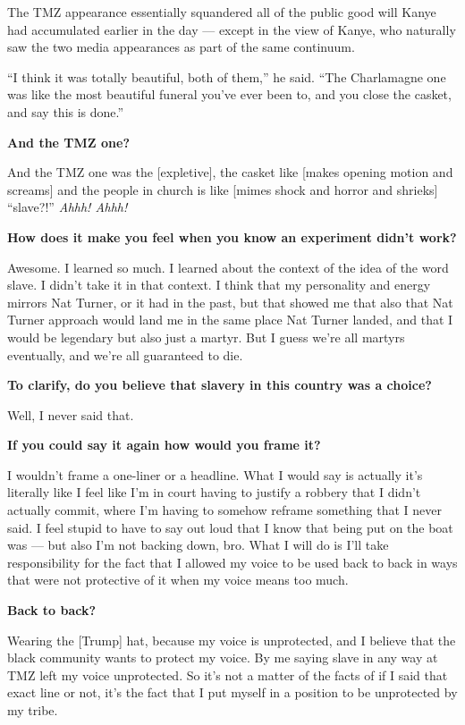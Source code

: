 The TMZ appearance essentially squandered all of the public good will
Kanye had accumulated earlier in the day --- except in the view of
Kanye, who naturally saw the two media appearances as part of the same
continuum.

``I think it was totally beautiful, both of them,'' he said. ``The
Charlamagne one was like the most beautiful funeral you've ever been to,
and you close the casket, and say this is done.''

\textbf{And the TMZ one?}

And the TMZ one was the {[}expletive{]}, the casket like {[}makes
opening motion and screams{]} and the people in church is like {[}mimes
shock and horror and shrieks{]} ``slave?!'' \emph{Ahhh! Ahhh!}

\textbf{How does it make you feel when you know an experiment didn't
work?}

Awesome. I learned so much. I learned about the context of the idea of
the word slave. I didn't take it in that context. I think that my
personality and energy mirrors Nat Turner, or it had in the past, but
that showed me that also that Nat Turner approach would land me in the
same place Nat Turner landed, and that I would be legendary but also
just a martyr. But I guess we're all martyrs eventually, and we're all
guaranteed to die.

\textbf{To clarify, do you believe that slavery in this country was a
choice?}

Well, I never said that.

\textbf{If you could say it again how would you frame it?}

I wouldn't frame a one-liner or a headline. What I would say is actually
it's literally like I feel like I'm in court having to justify a robbery
that I didn't actually commit, where I'm having to somehow reframe
something that I never said. I feel stupid to have to say out loud that
I know that being put on the boat was --- but also I'm not backing down,
bro. What I will do is I'll take responsibility for the fact that I
allowed my voice to be used back to back in ways that were not
protective of it when my voice means too much.

\textbf{Back to back?}

Wearing the {[}Trump{]} hat, because my voice is unprotected, and I
believe that the black community wants to protect my voice. By me saying
slave in any way at TMZ left my voice unprotected. So it's not a matter
of the facts of if I said that exact line or not, it's the fact that I
put myself in a position to be unprotected by my tribe.

